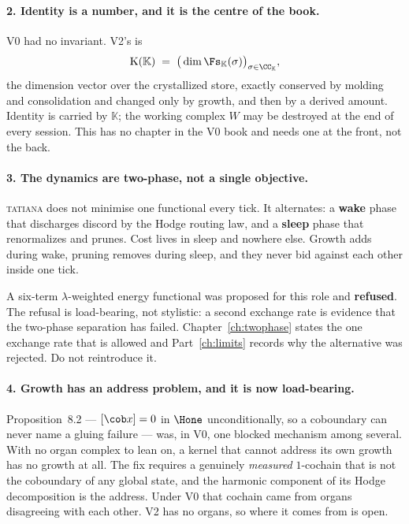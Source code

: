 \paragraph{2. Identity is a number, and it is the centre of the book.} V0 had
no invariant. V2's is
\[
  \mathrm{K}(\mathbb{K}) \;=\; \big(\dim \Fs_{\mathbb{K}}(\sigma)\big)_{\sigma \in \CC_{\mathbb{K}}},
\]
the dimension vector over the crystallized store, exactly conserved by
molding and consolidation and changed only by growth, and then by a derived
amount. Identity is carried by $\mathbb{K}$; the working complex $W$ may be
destroyed at the end of every session. This has no chapter in the V0 book and
needs one at the front, not the back.

\paragraph{3. The dynamics are two-phase, not a single objective.}
\textsc{tatiana} does not minimise one functional every tick. It alternates:
a \textbf{wake} phase that discharges discord by the Hodge routing law, and a
\textbf{sleep} phase that renormalizes and prunes. Cost lives in sleep and
nowhere else. Growth adds during wake, pruning removes during sleep, and they
never bid against each other inside one tick.

\begin{hon}
\Hon A six-term $\lambda$-weighted energy functional was proposed for this
role and \textbf{refused}. The refusal is load-bearing, not stylistic: a
second exchange rate is evidence that the two-phase separation has failed.
Chapter~\ref{ch:twophase} states the one exchange rate that is allowed and
Part~\ref{ch:limits} records why the alternative was rejected. Do not
reintroduce it.
\end{hon}

\paragraph{4. Growth has an address problem, and it is now load-bearing.}
Proposition~8.2 --- $[\cob x]=0$ in $\Hone$ unconditionally, so a coboundary
can never name a gluing failure --- was, in V0, one blocked mechanism among
several. With no organ complex to lean on, a kernel that cannot address its
own growth has no growth at all. The fix requires a genuinely \emph{measured}
$1$-cochain that is not the coboundary of any global state, and the harmonic
component of its Hodge decomposition is the address. Under V0 that cochain
came from organs disagreeing with each other. V2 has no organs, so where it
comes from is open.

